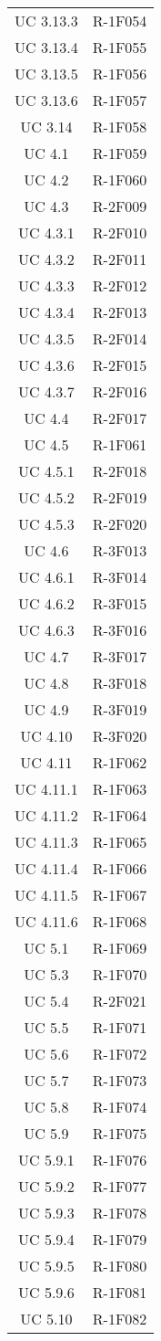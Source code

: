 \begin{tabularx}{\textwidth}{c|c}
		UC 3.13.3 & R-1F054 \\
		UC 3.13.4 & R-1F055 \\
		UC 3.13.5 & R-1F056 \\
		UC 3.13.6 & R-1F057 \\
		UC 3.14 & R-1F058 \\
		UC 4.1 & R-1F059 \\
		UC 4.2 & R-1F060 \\
		UC 4.3 & R-2F009 \\
		UC 4.3.1 & R-2F010 \\
		UC 4.3.2 & R-2F011 \\
		UC 4.3.3 & R-2F012 \\
		UC 4.3.4 & R-2F013 \\
		UC 4.3.5 & R-2F014 \\
		UC 4.3.6 & R-2F015 \\
		UC 4.3.7 & R-2F016 \\
		UC 4.4 & R-2F017 \\
		UC 4.5 & R-1F061 \\
		UC 4.5.1 & R-2F018 \\
		UC 4.5.2 & R-2F019 \\
		UC 4.5.3 & R-2F020 \\
		UC 4.6 & R-3F013 \\
		UC 4.6.1 & R-3F014 \\
		UC 4.6.2 & R-3F015 \\
		UC 4.6.3 & R-3F016 \\
		UC 4.7 & R-3F017 \\
		UC 4.8 & R-3F018 \\
		UC 4.9 & R-3F019 \\
		UC 4.10 & R-3F020 \\
		UC 4.11 & R-1F062 \\
		UC 4.11.1 & R-1F063 \\
		UC 4.11.2 & R-1F064 \\
		UC 4.11.3 & R-1F065 \\
		UC 4.11.4 & R-1F066 \\
		UC 4.11.5 & R-1F067 \\
		UC 4.11.6 & R-1F068 \\
		UC 5.1 & R-1F069 \\
		UC 5.3 & R-1F070 \\
		UC 5.4 & R-2F021 \\
		UC 5.5 & R-1F071 \\
		UC 5.6 & R-1F072 \\
		UC 5.7 & R-1F073 \\
		UC 5.8 & R-1F074 \\
		UC 5.9 & R-1F075 \\
		UC 5.9.1 & R-1F076 \\
		UC 5.9.2 & R-1F077 \\
		UC 5.9.3 & R-1F078 \\
		UC 5.9.4 & R-1F079 \\
		UC 5.9.5 & R-1F080 \\
		UC 5.9.6 & R-1F081 \\
		UC 5.10 & R-1F082 \\


\end{tabularx}
